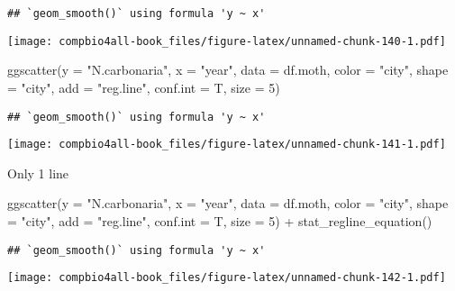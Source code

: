 \documentclass[
]{book}
\newenvironment{Shaded}{\begin{snugshade}}{\end{snugshade}}
\newcommand{\AttributeTok}[1]{\textcolor[rgb]{0.77,0.63,0.00}{#1}}
\newcommand{\DecValTok}[1]{\textcolor[rgb]{0.00,0.00,0.81}{#1}}
\newcommand{\FunctionTok}[1]{\textcolor[rgb]{0.00,0.00,0.00}{#1}}
\newcommand{\NormalTok}[1]{#1}
\newcommand{\SpecialCharTok}[1]{\textcolor[rgb]{0.00,0.00,0.00}{#1}}
\newcommand{\StringTok}[1]{\textcolor[rgb]{0.31,0.60,0.02}{#1}}
\begin{document}
\begin{verbatim}
## `geom_smooth()` using formula 'y ~ x'
\end{verbatim}

\texttt{[image: compbio4all-book\_files/figure-latex/unnamed-chunk-140-1.pdf]}

\begin{Shaded}
\begin{Highlighting}[]
\FunctionTok{ggscatter}\NormalTok{(}\AttributeTok{y =} \StringTok{"N.carbonaria"}\NormalTok{,}
          \AttributeTok{x =} \StringTok{"year"}\NormalTok{,}
          \AttributeTok{data =}\NormalTok{ df.moth,}
          \AttributeTok{color =} \StringTok{"city"}\NormalTok{,}
          \AttributeTok{shape =} \StringTok{"city"}\NormalTok{,}
          \AttributeTok{add =} \StringTok{"reg.line"}\NormalTok{,}
          \AttributeTok{conf.int =}\NormalTok{ T,}
          \AttributeTok{size =} \DecValTok{5}\NormalTok{)}
\end{Highlighting}
\end{Shaded}

\begin{verbatim}
## `geom_smooth()` using formula 'y ~ x'
\end{verbatim}

\texttt{[image: compbio4all-book\_files/figure-latex/unnamed-chunk-141-1.pdf]}

Only 1 line

\begin{Shaded}
\begin{Highlighting}[]
\FunctionTok{ggscatter}\NormalTok{(}\AttributeTok{y =} \StringTok{"N.carbonaria"}\NormalTok{,}
          \AttributeTok{x =} \StringTok{"year"}\NormalTok{,}
          \AttributeTok{data =}\NormalTok{ df.moth,}
          \AttributeTok{color =} \StringTok{"city"}\NormalTok{,}
          \AttributeTok{shape =} \StringTok{"city"}\NormalTok{,}
          \AttributeTok{add =} \StringTok{"reg.line"}\NormalTok{,}
          \AttributeTok{conf.int =}\NormalTok{ T,}
          \AttributeTok{size =} \DecValTok{5}\NormalTok{) }\SpecialCharTok{+}
  \FunctionTok{stat\_regline\_equation}\NormalTok{()}
\end{Highlighting}
\end{Shaded}

\begin{verbatim}
## `geom_smooth()` using formula 'y ~ x'
\end{verbatim}

\texttt{[image: compbio4all-book\_files/figure-latex/unnamed-chunk-142-1.pdf]}
\end{document}
